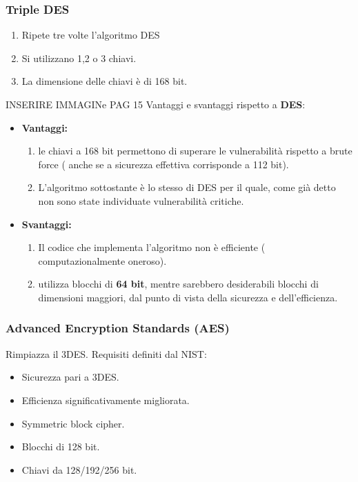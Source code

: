 \documentclass[12pt]{article}
\begin{document}
		\subsubsection{Triple DES}
			\begin{enumerate}
				\item Ripete tre volte l'algoritmo DES
				\item Si utilizzano 1,2 o 3 chiavi.
				\item La dimensione delle chiavi è di 168 bit.
			\end{enumerate}
			INSERIRE IMMAGINe PAG 15
			Vantaggi e svantaggi rispetto a \textbf{DES}:
			\begin{itemize}
				\item \textbf{Vantaggi:}
				\begin{enumerate}
					\item le chiavi a 168 bit permettono di superare le vulnerabilità rispetto a brute force ( anche se a sicurezza effettiva corrisponde a 112 bit).
					\item L'algoritmo sottostante è lo stesso di DES per il quale, come già detto non sono state individuate vulnerabilità critiche.
				\end{enumerate}
				\item \textbf{Svantaggi:} 
				\begin{enumerate}
					\item Il codice che implementa l'algoritmo non è efficiente ( computazionalmente oneroso).
					\item utilizza blocchi di \textbf{64 bit}, mentre sarebbero desiderabili blocchi di dimensioni maggiori, dal punto di vista della sicurezza e dell'efficienza.
				\end{enumerate}  
			\end{itemize}
		\subsubsection{Advanced Encryption Standards (AES)}
			Rimpiazza il 3DES. Requisiti definiti dal NIST:
			\begin{itemize}
				\item Sicurezza pari a 3DES.
				\item Efficienza significativamente migliorata.
				\item Symmetric block cipher.
				\item Blocchi di 128 bit.
				\item Chiavi da 128/192/256 bit.
			\end{itemize}
\end{document}
